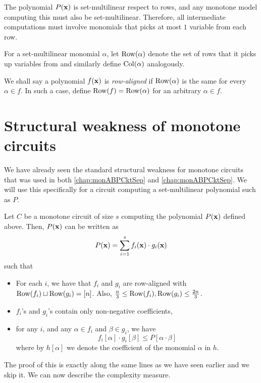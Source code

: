 The polynomial $P(\mathbf{x})$ is set-multilinear respect to rows, and any monotone model computing this must also be set-multilinear. Therefore, all intermediate computations must involve monomials that picks at most $1$ variable from each row.

For a set-multilinear monomial $\alpha$, let $\operatorname{Row}(\alpha)$ denote the set of rows that it picks up variables from and similarly define $\operatorname{Col}(\alpha)$ analogously.

We shall say a polynomial $f(\mathbf{x})$ is \emph{row-aligned} if $\operatorname{Row}(\alpha)$ is the same for every $\alpha \in f$. In such a case, define $\operatorname{Row}(f) = \operatorname{Row}(\alpha)$ for an arbitrary $\alpha \in f$. \\


\section{Structural weakness of monotone circuits}

We have already seen the standard structural weakness for monotone circuits that was used in both \autoref{chap:monABPCktSep} and \autoref{chap:monABPCktSep}. We will use this specifically for a circuit computing a set-multilinear polynomial such as $P$. 

\begin{lemma}\label{lem:monVPVNP:structure}
  Let $C$ be a monotone circuit of size $s$ computing the polynomial $P(\mathbf{x})$ defined above. Then, $P(\mathbf{x})$ can be written as
  \begin{equation}\label{eqn:monVPVNP-main}
    P(\mathbf{x}) = \sum_{i=1}^s f_i(\mathbf{x}) \cdot g_i(\mathbf{x})
  \end{equation}
  such that
  \begin{itemize}\itemsep 0pt
  \item For each $i$, we have that $f_i$ and $g_i$ are row-aligned with
    $\operatorname{Row}(f_i) \sqcup \operatorname{Row}(g_i) = [n]$. Also, $\frac{n}{3} \leq \operatorname{Row}(f_i), \operatorname{Row}(g_i) \leq \frac{2n}{3}$. 
  \item $f_i$'s and $g_i$'s contain only non-negative coefficients,
  \item for any $i$, and any $\alpha \in f_i$ and $\beta\in g_i$, we have
    \[
      f_i[\alpha]\cdot g_i[\beta] \leq P[\alpha \cdot \beta]
    \]
    where by $h[\alpha]$ we denote the coefficient of the monomial $\alpha$ in $h$.
  \end{itemize}
\end{lemma}

\noindent
The proof of this is exactly along the same lines as we have seen earlier and we skip it. We can now describe the complexity measure.

